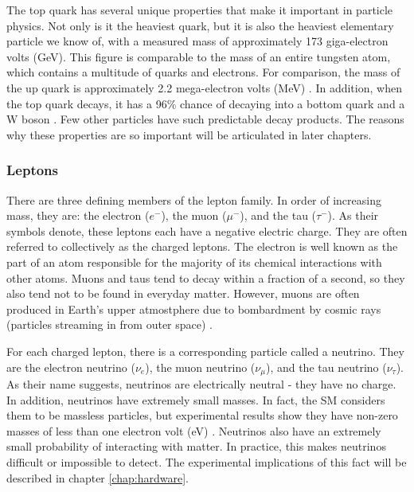 The top quark has several unique properties that make it important
in particle physics. Not only is
it the heaviest quark, but it is also the heaviest elementary particle
we know of, with a measured mass of approximately 173 giga-electron
volts (GeV). This figure is comparable to the mass
of an entire tungsten atom, which contains a multitude of quarks and
electrons. For comparison, the mass of the up quark is approximately
2.2 mega-electron volts (MeV) \cite{pdg}.
In addition, when the top quark decays, it has a 96\% chance of
decaying into a bottom quark and a W boson \cite{pdg}. Few other
particles have such predictable decay products. The reasons why these
properties are so important will be articulated in later chapters. %

\subsubsection*{Leptons}
There are three defining members of the lepton family. In order of
increasing mass, they are: the electron
($e^-$), the muon ($\mu^-$), and the tau ($\tau^-$). As their symbols
denote, these leptons each have a negative electric charge. They are
often referred to collectively as the charged leptons.
The electron is well known as the part of an atom responsible for the
majority of its chemical interactions with other atoms. Muons and taus
tend to decay within a fraction of a second, so they also tend not to
be found in everyday matter. However, muons are often produced in
Earth's upper atmostphere due to bombardment by cosmic rays (particles
streaming in from outer space) \cite{griffiths}.

For each charged lepton, there is a corresponding particle called a
neutrino. They are the electron neutrino ($\nu_e$), the muon
neutrino ($\nu_{\mu}$), and the tau neutrino ($\nu_{\tau}$). As their
name suggests, neutrinos are electrically neutral - they have no
charge. In addition, neutrinos have extremely small masses. In fact,
the SM considers them to be massless particles, but experimental
results show they have non-zero masses of less than one electron volt
(eV) \cite{pdg}. Neutrinos also have an extremely small probability of
interacting with matter. In practice, this makes neutrinos
difficult or impossible to detect. The experimental implications of
this fact will be described in chapter \ref{chap:hardware}. %

